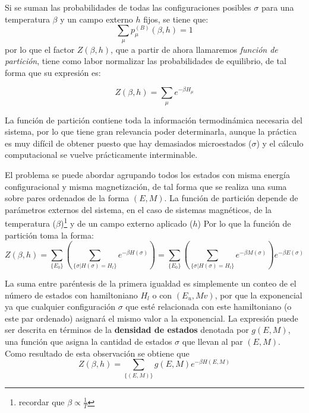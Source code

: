 \documentclass[12pt]{book}
\begin{document}
Si se suman las probabilidades de todas las configuraciones posibles $\sigma$ para una temperatura $\beta$ y un campo externo $h$ fijos, se tiene que:
\begin{equation}
\sum_{\mu} p_{\mu}^{(B)}(\beta,h)=1
\end{equation}
por lo que el factor $Z(\beta, h)$, que a partir de ahora llamaremos \textit{función de partición},  tiene como labor normalizar las probabilidades de equilibrio, de tal forma que su expresión es:

\begin{equation}
 Z(\beta,h)= \sum_{\mu} e^{-\beta H_{\mu}}
\end{equation}

La función de partición contiene toda la información termodinámica necesaria del sistema, por lo que tiene gran relevancia poder determinarla, aunque la práctica es muy difícil de obtener puesto que hay demasiados microestados ($\sigma$) y el cálculo computacional se vuelve prácticamente interminable.
 
El problema se puede abordar agrupando todos los estados con misma energía configuracional y misma magnetización,  de tal forma que se realiza una suma sobre pares ordenados de la forma $(E,M)$. La función de partición depende de parámetros externos del sistema, en el caso de sistemas magnéticos, de la temperatura ($\beta$)\footnote{recordar que $\beta \propto \frac{1}{T}$} y de un campo externo aplicado ($h$)
Por lo que la función de partición toma la forma:
\begin{equation}
 Z(\beta,h) = \sum_{\{E_{0}\}}\left(\sum_{\{\sigma | H(\sigma) = H_{l}\}} e^{-\beta H(\sigma)}\right)= \sum_{\{E_{0}\}}\left(\sum_{\{\sigma | H(\sigma) = H_{l}\}} e^{-\beta M(\sigma)} \right)e^{-\beta E(\sigma)}
\end{equation}

La suma entre paréntesis de la primera igualdad es simplemente un conteo de el número de estados con hamiltoniano $H_{l}$ o con $(E_{u},M{v})$,  por que la exponencial ya que cualquier configuración $\sigma$ que esté relacionada con este hamiltoniano (o este par ordenado) asignará el mismo valor a la exponencial. La expresión puede ser descrita en términos de la  \textbf{densidad de estados} denotada por $g(E,M)$, una función que asigna  la cantidad de estados $\sigma$ que llevan al par $(E,M)$. Como resultado de esta observación se obtiene que 
\begin{equation}
 Z(\beta, h) = \sum_{\{(E,M)\}} g(E,M)e^{-\beta H(E,M)}
\end{equation}
\end{document}
